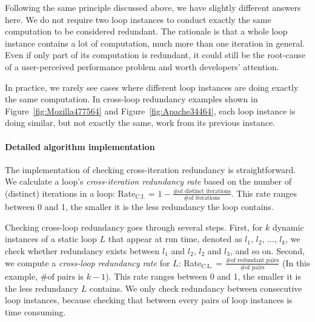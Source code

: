 Following the same principle discussed above, we have slightly different
answers here.
We do not require two loop instances to
conduct exactly the same computation to be considered redundant. The rationale
is that a whole loop instance contains a lot of computation, much more than
one iteration in general. Even if only part of its computation
is redundant, it could still be the root-cause of a user-perceived performance
problem and worth developers' attention. 

In practice, we rarely see cases where different loop 
instances are doing exactly the same computation.
In cross-loop redundancy examples shown in 
Figure~\ref{fig:Mozilla477564} and
Figure~\ref{fig:Apache34464}, each loop instance is doing similar, but not
exactly the same, work from its previous instance.



\paragraph{Detailed algorithm implementation}

The implementation of checking cross-iteration redundancy is straightforward.
We calculate a loop's \textit{cross-iteration redundancy rate} based on
the number of (distinct) iterations in a loop:
Rate$_\text{C.I.}$ = $1 - \frac{\text{\# of distinct iterations}}{\text{\# of iterations}}$.
This rate ranges between 0 and 1, the smaller it is
the less redundancy the loop contains.

Checking cross-loop redundancy goes through several
steps. First, for $k$ dynamic instances of a static loop $L$ that appear
at run time, denoted as $l_1$, $l_2$,
..., $l_k$, we check whether redundancy exists between $l_1$ and $l_2$, 
$l_2$ and $l_3$, and so on. Second, we compute a 
\textit{cross-loop redundancy rate} for $L$:
Rate$_\text{C.L.}$ = $\frac{\text{\# of redundant pairs}}{\text{\# of pairs}}$
(In this example, $\text{\# of pairs}$ is $k-1$).
This rate ranges between 0 and 1, the smaller it is the less redundancy
$L$ contains.
We only check redundancy between consecutive loop instances, because  
checking that between every pairs of loop
instances is time consuming.

